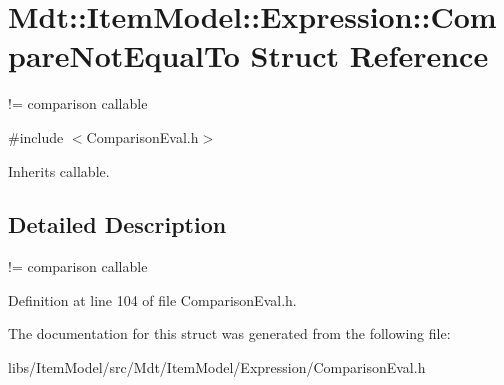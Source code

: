 \hypertarget{struct_mdt_1_1_item_model_1_1_expression_1_1_compare_not_equal_to}{}\section{Mdt\+:\+:Item\+Model\+:\+:Expression\+:\+:Compare\+Not\+Equal\+To Struct Reference}
\label{struct_mdt_1_1_item_model_1_1_expression_1_1_compare_not_equal_to}


!= comparison callable  




{\ttfamily \#include $<$Comparison\+Eval.\+h$>$}



Inherits callable.



\subsection{Detailed Description}
!= comparison callable 

Definition at line 104 of file Comparison\+Eval.\+h.



The documentation for this struct was generated from the following file\+:\begin{DoxyCompactItemize}
\item 
libs/\+Item\+Model/src/\+Mdt/\+Item\+Model/\+Expression/Comparison\+Eval.\+h\end{DoxyCompactItemize}
